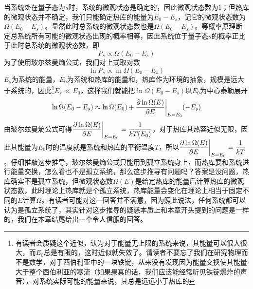 \documentclass[../../main.tex]{subfiles}
\begin{document}
当系统处在量子态为\(s\)时，系统的微观状态是确定的，因此微观状态数为\(1\)；但热库的微观状态并不确定，我们只能确定热库的能量为\(E_0-E_s\)，记它的微观状态数为\(\Omega(E_0-E_s)\)。显然此时总系统的微观状态数也是\(\Omega(E_0-E_s)\)。等概率原理断定总系统所有可能的微观状态出现的概率相等，因此系统位于量子态\(s\)的概率正比于此时总系统的微观状态数，即
\begin{equation}
    P_s\propto \Omega(E_0-E_s)
\end{equation}
为了使用玻尔兹曼熵公式，我们对上式取对数
\begin{equation*}
    \ln P_s \propto \ln \Omega(E_0-E_s)
\end{equation*}
\(E_s\)为系统的能量，\(E_0\)为系统和热库的能量和，热库作为环境的抽象，规模是远大于系统的，因此\footnote{有读者会质疑这个近似，认为对于能量无上限的系统来说，其能量可以很大很大，而\(E_0\)总是有限的，这时近似就失效了。请读者不要忘了我们在研究物理而不是数学，对于西伯利亚中的一块铁锭，从来没有发现因为能量交换使其能量大于整个西伯利亚的寒流（如果果真的话，我们应该能经常听见铁锭爆炸的声音），对系统实际可能的能量来说，其总是远远小于热库的}\(E_s \ll E_0\)，这样我们就能把\(\ln \Omega(E_0-E_s)\)以\(E_0\)为中心泰勒展开
\begin{equation}
    \ln\Omega(E_0-E_s)\approx \ln\Omega(E_0)+\pdv{\ln\Omega(E)}{E}\bigg|_{E=E_0}(-E_s)
\end{equation}
由玻尔兹曼熵公式可得\(\displaystyle\pdv{\ln\Omega(E)}{E}\bigg|_{E=E_0}=\frac{1}{kT(E_0)}\)，对于热库其热容近似无限，因此其能量为\(E_0\)时的温度就是系统和热库的平衡温度\(T\)，所以\(\displaystyle\pdv{\ln\Omega(E)}{E}\bigg|_{E=E_0}=\frac{1}{kT}\)。仔细推敲这步推导，玻尔兹曼熵公式只能用到孤立系统身上，而热库要和系统进行能量交换，怎么看也不是孤立系统，那么这步推导有问题吗？答案是没问题，热库确实不是孤立系统，但微观状态数\(\Omega(E)\)是给定热库的能量后计算热库的微观状态数，此时理论上热库就是个孤立系统，热库能量会变化在理论上相当于固定不同的\(E\)计算\(\Omega\)。有读者可能对这一回答并不满意，因为照此说法，任何系统都可以认为是孤立系统了，其实针对这步推导的疑惑本质上和本章开头提到的问题是一样的，我们在本章结尾给出一个令人信服的回答。
\end{document}
